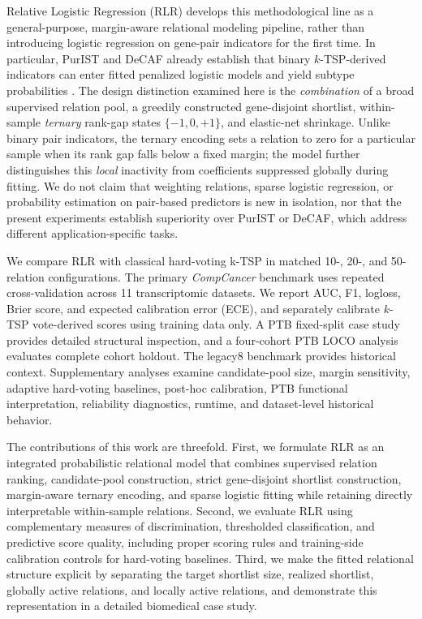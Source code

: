 \documentclass[preprint,12pt,a4paper]{elsarticle}
\begin{document}
Relative Logistic Regression (RLR) develops this methodological line as a general-purpose, margin-aware relational modeling pipeline, rather than introducing logistic regression on gene-pair indicators for the first time. In particular, PurIST and DeCAF already establish that binary $k$-TSP-derived indicators can enter fitted penalized logistic models and yield subtype probabilities \cite{Rashid2020PurIST,Peng2026DeCAF}. The design distinction examined here is the \emph{combination} of a broad supervised relation pool, a greedily constructed gene-disjoint shortlist, within-sample \emph{ternary} rank-gap states $\{-1,0,+1\}$, and elastic-net shrinkage. Unlike binary pair indicators, the ternary encoding sets a relation to zero for a particular sample when its rank gap falls below a fixed margin; the model further distinguishes this \emph{local} inactivity from coefficients suppressed globally during fitting. We do not claim that weighting relations, sparse logistic regression, or probability estimation on pair-based predictors is new in isolation, nor that the present experiments establish superiority over PurIST or DeCAF, which address different application-specific tasks.

We compare RLR with classical hard-voting k-TSP in matched 10-, 20-, and 50-relation configurations. The primary \emph{CompCancer} benchmark uses repeated cross-validation across 11 transcriptomic datasets. We report AUC, F1, logloss, Brier score, and expected calibration error (ECE), and separately calibrate $k$-TSP vote-derived scores using training data only. A PTB fixed-split case study provides detailed structural inspection, and a four-cohort PTB LOCO analysis evaluates complete cohort holdout. The legacy8 benchmark provides historical context. Supplementary analyses examine candidate-pool size, margin sensitivity, adaptive hard-voting baselines, post-hoc calibration, PTB functional interpretation, reliability diagnostics, runtime, and dataset-level historical behavior.

The contributions of this work are threefold. First, we formulate RLR as an integrated probabilistic relational model that combines supervised relation ranking, candidate-pool construction, strict gene-disjoint shortlist construction, margin-aware ternary encoding, and sparse logistic fitting while retaining directly interpretable within-sample relations. Second, we evaluate RLR using complementary measures of discrimination, thresholded classification, and predictive score quality, including proper scoring rules and training-side calibration controls for hard-voting baselines. Third, we make the fitted relational structure explicit by separating the target shortlist size, realized shortlist, globally active relations, and locally active relations, and demonstrate this representation in a detailed biomedical case study.
\end{document}
